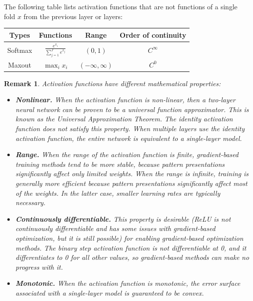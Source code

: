 \documentclass[a4paper]{article}
\theoremstyle{definition}
\theoremstyle{plain}
\newtheorem{remark}{Remark}
\begin{document}
The following table lists activation functions that are not functions of a single fold $x$ from the previous layer or layers:
\begin{table}[H]
\centering
\begin{tabular}{cccc}
\hline
{ \textbf{Types}} & { \textbf{Functions}}                            & { \textbf{Range}}        & { \textbf{Order of continuity}} \\ \hline
{ Softmax}        & { $\frac {e^{x_{i}}}{\sum _{j=1}^{J}e^{x_{j}}}$} & { $(0,1)$}               & { $C^{\infty }$}                \\ 
{ Maxout}         & { $\max _{i}x_{i}$}                              & { $ (-\infty ,\infty )$} & { $C^{0}$}                      \\ \hline
\end{tabular}
\end{table}

\begin{remark}
Activation functions have different mathematical properties:
\begin{itemize}
    \item \textbf{Nonlinear.} When the activation function is non-linear, then a two-layer neural network can be proven to be a universal function approximator. This is known as the Universal Approximation Theorem. The identity activation function does not satisfy this property. When multiple layers use the identity activation function, the entire network is equivalent to a single-layer model.
    \item \textbf{Range.} When the range of the activation function is finite, gradient-based training methods tend to be more stable, because pattern presentations significantly affect only limited weights. When the range is infinite, training is generally more efficient because pattern presentations significantly affect most of the weights. In the latter case, smaller learning rates are typically necessary.
    \item \textbf{Continuously differentiable.} This property is desirable (ReLU is not continuously differentiable and has some issues with gradient-based optimization, but it is still possible) for enabling gradient-based optimization methods. The binary step activation function is not differentiable at 0, and it differentiates to 0 for all other values, so gradient-based methods can make no progress with it.
    \item \textbf{Monotonic.} When the activation function is monotonic, the error surface associated with a single-layer model is guaranteed to be convex.
\end{itemize}
\end{remark}
\end{document}
